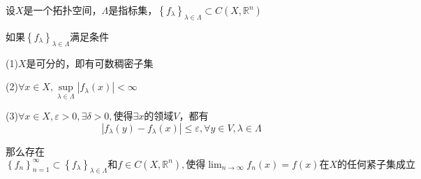 \documentclass[lang=cn,10pt]{elegantbook}
\begin{document}
	\begin{theorem}
		设$X$是一个拓扑空间，$ \varLambda$是指标集，$\left\{ f_{\lambda} \right\} _{\lambda \in \varLambda}\subset C\left( X,\mathbb{R} ^n \right) $
		
		如果$\left\{ f_{\lambda} \right\} _{\lambda \in \varLambda}$满足条件
		
		(1)$X$是可分的，即有可数稠密子集
		
		(2)$\forall x\in X,\mathop {\mathrm{sup}} \limits_{\lambda \in \varLambda}|f_{\lambda}\left( x \right) |<\infty $
		
		(3)$\forall x\in X,\varepsilon >0,\exists \delta >0,\text{使得}\exists x\text{的领域}V\text{，都有}$
		\begin{equation*}
			|f_{\lambda}\left( y \right) -f_{\lambda}\left( x \right) |\le \varepsilon ,\forall y\in V,\lambda \in \varLambda 
		\end{equation*}
	
	那么存在$\left\{ f_n \right\} _{n=1}^{\infty}\subset \left\{ f_{\lambda} \right\} _{\lambda \in \varLambda}\text{和}f\in C\left( X,\mathbb{R} ^n \right) ,\text{使得}\lim_{n\rightarrow \infty} f_n\left( x \right) =f\left( x \right) \text{在}X\text{的任何紧子集成立}
	$
	\end{theorem}
\end{document}
